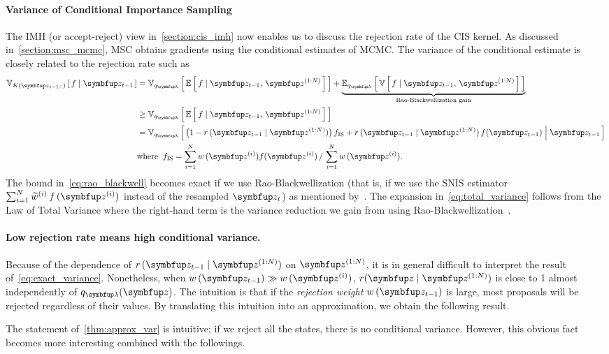 \paragraph{Variance of Conditional Importance Sampling}
The IMH (or accept-reject) view in~\cref{section:cis_imh} now enables us to discuss the rejection rate of the CIS kernel.
As discussed in~\cref{section:msc_mcmc}, MSC obtains gradients using the conditional estimates of MCMC.
The variance of the conditional estimate is closely related to the rejection rate such as
\begin{align}
  \Vsub{K(\vz_{t-1},\cdot)}{f \mid \vz_{t-1}} 
  &=\Vsub{q_{\vlambda}}{ \E{ f \mid \vz_{t-1},\,\vz^{(1:N)} } } + \underbrace{\Esub{q_{\vlambda}}{ \V{ f \mid \vz_{t-1},\,\vz^{(1:N)} } }}_{\text{Rao-Blackwellization gain}} \label{eq:total_variance} \\
  &\geq \Vsub{q_{\vlambda}}{ \E{ f \mid \vz_{t-1},\,\vz^{(1:N)} } } \label{eq:rao_blackwell}\\
  &= \Vsub{q_{\vlambda}}{ \big(1 - r\,(\vz_{t-1}\mid\vz^{(1:N)})\big)\, f_{\mathrm{IS}}
    + r\,(\vz_{t-1}\mid\vz^{(1:N)})\,f(\vz_{t-1}) \;\middle\vert\; \vz_{t-1} } \label{eq:exact_variance} \\
  &\text{where}\;\; f_{\mathrm{IS}} = {\sum_{i=1}^N w\,(\vz^{(i)}) f(\vz^{(i)})\,/\,\sum_{i=1}^N w\,(\vz^{(i)})}. \nonumber 
\end{align}
%
The bound in~\eqref{eq:rao_blackwell} becomes exact if we use Rao-Blackwellization (that is, if we use the SNIS estimator \(\sum^{N}_{i=1} \widetilde{w}^{(i)}\,f\,(\vz^{(i)})\) instead of the resampled \(\vz_t\)) as mentioned by~\citet{NEURIPS2020_b2070693}.
The expansion in~\eqref{eq:total_variance} follows from the Law of Total Variance where the right-hand term is the variance reduction we gain from using Rao-Blackwellization~\citep{bernton_locally_2015}.

\vspace{-0.1in}
\paragraph{Low rejection rate means high conditional variance.}
Because of the dependence of \(r\,(\vz_{t-1}\mid\vz^{(1:N)})\) on \(\vz^{(1:N)}\), it is in general difficult to interpret the result of~\eqref{eq:exact_variance}.
Nonetheless, when \(w\,(\vz_{t-1}) \gg w\,(\vz^{(i)})\), \(r(\vz\mid\vz^{(1:N)})\) is close to 1 almost independently of \(q_{\vlambda}(\vz)\).
The intuition is that if the \textit{rejection weight} \(w\,(\vz_{t-1})\) is large, most proposals will be rejected regardless of their values.
By translating this intuition into an approximation, we obtain the following result.
%

%
The statement of~\cref{thm:approx_var} is intuitive; if we reject all the states, there is no conditional variance.
However, this obvious fact becomes more interesting combined with the followings.

